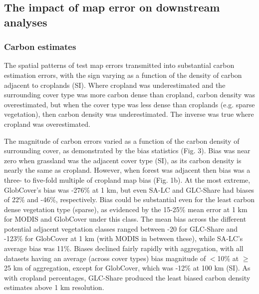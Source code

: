 \documentclass[12 pt, titlepage, a4paper]{article}
\begin{document}
\vspace{-0.3 cm}
\subsection*{The impact of map error on downstream analyses}
\vspace{-0.2 cm}
\subsubsection*{Carbon estimates}
\vspace{-0.2 cm}
The spatial patterns of test map errors transmitted into substantial carbon estimation errors, with the sign varying as a function of the density of carbon adjacent to croplands (SI). Where cropland was underestimated and the surrounding cover type was more carbon dense than cropland, carbon density was overestimated, but when the cover type was less dense than croplands (e.g. sparse vegetation), then carbon density was underestimated. The inverse was true where cropland was overestimated. 

The magnitude of carbon errors varied as a function of the carbon density of surrounding cover, as demonstrated by the bias statistics (Fig. 3). Bias was near zero when grassland was the adjacent cover type (SI), as its carbon density is nearly the same as cropland. However, when forest was adjacent then bias was a three- to five-fold multiple of cropland map bias (Fig. 1b). At the most extreme, GlobCover's bias was -276\% at 1 km, but even SA-LC and GLC-Share had biases of 22\% and -46\%, respectively. Bias could be substantial even for the least carbon dense vegetation type (sparse), as evidenced by the 15-25\% mean error at 1 km for MODIS and GlobCover under this class.  The mean bias across the different potential adjacent vegetation classes ranged between -20 for GLC-Share and -123\% for GlobCover at 1 km (with MODIS in between these), while SA-LC's average bias was 11\%.  Biases declined fairly rapidly with aggregation, with all datasets having an average (across cover types) bias magnitude of $<$10\% at $\geq$25 km of aggregation, except for GlobCover, which was -12\% at 100 km (SI).  As with cropland percentages, GLC-Share produced the least biased carbon density estimates above 1 km resolution. 
\end{document}
